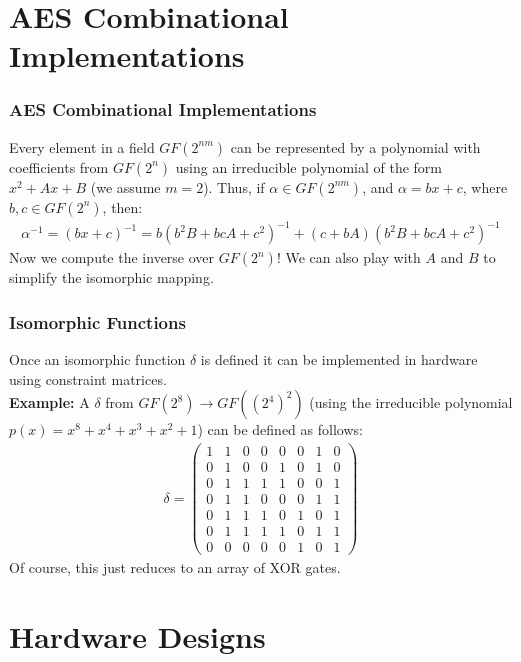 \documentclass[handout]{beamer}
\begin{document}
\section{AES Combinational Implementations}
\begin{frame}
	\frametitle{AES Combinational Implementations}
	Every element in a field $GF(2^{nm})$ can be represented by a polynomial with coefficients from $GF(2^n)$ using 
	an irreducible polynomial of the form $x^2 + Ax + B$ (we assume $m = 2$). Thus, if $\alpha \in GF(2^{nm})$, and $\alpha = bx + c$, where $b,c \in GF(2^n)$, then:
	\begin{align*}
	\alpha^{-1} = (bx + c)^{-1} = b(b^2B + bcA + c^2)^{-1} + (c + bA)(b^2B + bcA + c^2)^{-1}
	\end{align*}
	Now we compute the inverse over $GF(2^n)$! We can also play with $A$ and $B$ to simplify the isomorphic mapping.
\end{frame}

\begin{frame}
	\frametitle{Isomorphic Functions}
	Once an isomorphic function $\delta$ is defined it can be implemented in hardware using constraint matrices.\\

	\textbf{Example:} A $\delta$ from $GF(2^8) \to GF((2^4)^2)$ (using the irreducible polynomial $p(x) = x^8 + x^4 + x^3 + x^2 + 1$) can be defined as follows:
	\begin{align*}
	\delta =  \left( \begin{array}{cccccccc}
1 & 1 & 0 & 0 & 0 & 0 & 1 & 0 \\
0 & 1 & 0 & 0 & 1 & 0 & 1 & 0 \\
0 & 1 & 1 & 1 & 1 & 0 & 0 & 1 \\
0 & 1 & 1 & 0 & 0 & 0 & 1 & 1 \\
0 & 1 & 1 & 1 & 0 & 1 & 0 & 1 \\
0 & 1 & 1 & 1 & 1 & 0 & 1 & 1 \\
0 & 0 & 0 & 0 & 0 & 1 & 0 & 1 \end{array} \right)
	\end{align*}
	Of course, this just reduces to an array of XOR gates.
\end{frame}

\section{Hardware Designs}
\end{document}
